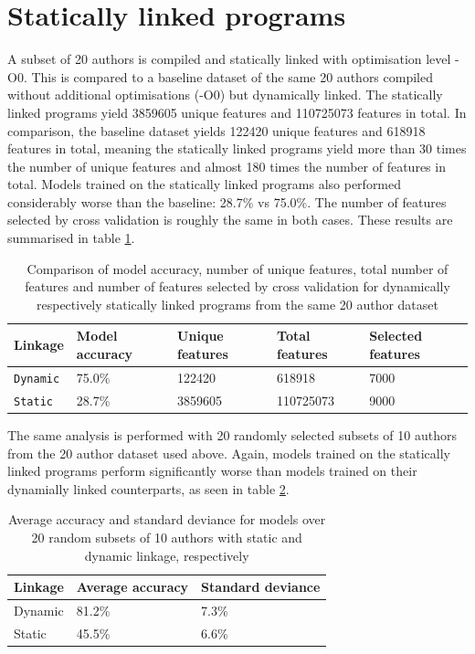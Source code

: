 \documentclass[a4paper,11pt]{kth-mag}
\begin{document}
\section{Statically linked programs}
A subset of 20 authors is compiled and statically linked with optimisation
level -O0. This is compared to a baseline dataset of the same 20 authors
compiled without additional optimisations (-O0) but dynamically linked. The
statically linked programs yield 3859605 unique features and 110725073 features
in total. In comparison, the baseline dataset yields 122420 unique features and
618918 features in total, meaning the statically linked programs yield more
than 30 times the number of unique features and almost 180 times the number of
features in total. Models trained on the statically linked programs also
performed considerably worse than the baseline: 28.7\% vs 75.0\%. The number of
features selected by cross validation is roughly the same in both cases. These
results are summarised in table \ref{tab:20-static-results}.

\begin{table}[!htb]
    \centering
        \begin{tabular}{ l l l l l }
        Linkage & Model accuracy & Unique features & Total features &
        Selected features \\ \hline
        \lstinline{Dynamic} & 75.0\% & 122420 & 618918 & 7000 \\
        \lstinline{Static} & 28.7\% & 3859605 & 110725073 & 9000 \\
        \end{tabular}
    \caption{Comparison of model accuracy, number of unique features, total
    number of features and number of features selected by cross validation for
    dynamically respectively statically linked programs from the same 20 author
    dataset} 
    \label{tab:20-static-results}
\end{table}

The same analysis is performed with 20 randomly selected subsets of 10 authors
from the 20 author dataset used above. Again, models trained on the statically
linked programs perform significantly worse than models trained on their
dynamially linked counterparts, as seen in table \ref{tab:10-static-results}. 

\begin{table}[!htb]
    \centering
        \begin{tabular}{ l l l }
        Linkage & Average accuracy & Standard deviance \\
        \hline
        Dynamic & 81.2\% & 7.3\% \\
        Static & 45.5\% & 6.6\%
        \end{tabular}
    \caption{Average accuracy and standard deviance for models over 20 random
    subsets of 10 authors with static and dynamic linkage, respectively}
    \label{tab:10-static-results}
\end{table}
\end{document}
